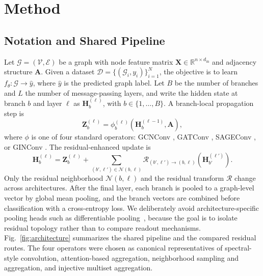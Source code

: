 \section{Method}
\label{sec:method}

\subsection{Notation and Shared Pipeline}
\label{sec:pipeline}

Let \(\mathcal{G}=(\mathcal{V},\mathcal{E})\) be a graph with node feature
matrix \(\mathbf{X}\in\mathbb{R}^{n\times d_{\mathrm{in}}}\) and adjacency
structure \(\mathbf{A}\). Given a dataset
\(\mathcal{D}=\{(\mathcal{G}_i,y_i)\}_{i=1}^{N}\), the objective is to learn
\(f_{\theta}:\mathcal{G}\rightarrow \hat{y}\), where \(\hat{y}\) is the predicted
graph label. Let \(B\) be the number of branches and \(L\) the number of
message-passing layers, and write the hidden state at branch \(b\) and layer
\(\ell\) as \(\mathbf{H}^{(\ell)}_{b}\), with \(b\in\{1,\ldots,B\}\). A
branch-local propagation step is
\begin{equation}
\mathbf{Z}^{(\ell)}_{b} =
\phi^{(\ell)}_{b}\left(\mathbf{H}^{(\ell-1)}_{b}, \mathbf{A}\right),
\label{eq:prop}
\end{equation}
where \(\phi\) is one of four standard operators: GCNConv \cite{kipf2017gcn},
GATConv \cite{velivckovic2017graph}, SAGEConv \cite{hamilton2017inductive}, or
GINConv \cite{xu2019gin}. The residual-enhanced update is
\begin{equation}
\mathbf{H}^{(\ell)}_{b} =
\mathbf{Z}^{(\ell)}_{b} +
\sum_{(b',\ell')\in\mathcal{N}(b,\ell)}
\mathcal{R}_{(b',\ell')\rightarrow(b,\ell)}
\left(\mathbf{H}^{(\ell')}_{b'}\right).
\label{eq:update}
\end{equation}
Only the residual neighborhood \(\mathcal{N}(b,\ell)\) and the residual
transform \(\mathcal{R}\) change across architectures. After the final layer,
each branch is pooled to a graph-level vector by global mean pooling, and the
branch vectors are combined before classification with a cross-entropy loss. We
deliberately avoid architecture-specific pooling heads such as differentiable
pooling~\cite{ying2018hierarchical}, because the goal is to isolate residual
topology rather than to compare readout mechanisms.
Fig.~\ref{fig:architecture} summarizes the shared pipeline and the compared
residual routes. The four operators were chosen as canonical representatives of
spectral-style convolution, attention-based aggregation, neighborhood sampling
and aggregation, and injective multiset aggregation.

